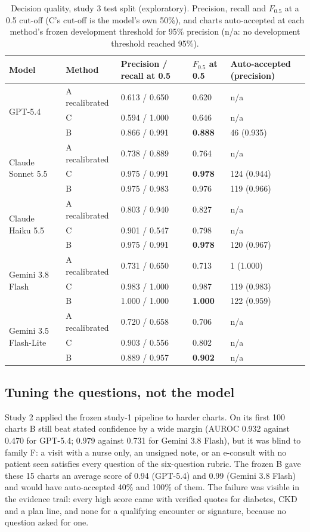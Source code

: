 \documentclass[10pt,letterpaper]{article}
\begin{document}
\begin{table}[!htbp]
\centering\small
\caption{Decision quality, study 3 test split (exploratory). Precision, recall and $F_{0.5}$ at a 0.5 cut-off (C's cut-off is the model's own 50\%), and charts auto-accepted at each method's frozen development threshold for 95\% precision (n/a: no development threshold reached 95\%).}\label{tab:decision}
\begin{tabular}{@{}lllll@{}}
\toprule
Model & Method & Precision / recall at 0.5 & $F_{0.5}$ at 0.5 & Auto-accepted (precision) \\
\midrule
\multirow{3}{*}{GPT-5.4} & A recalibrated & 0.613 / 0.650 & 0.620 & n/a \\
 & C & 0.594 / 1.000 & 0.646 & n/a \\
 & B & 0.866 / 0.991 & \textbf{0.888} & 46 (0.935) \\
\midrule
\multirow{3}{*}{Claude Sonnet 5.5} & A recalibrated & 0.738 / 0.889 & 0.764 & n/a \\
 & C & 0.975 / 0.991 & \textbf{0.978} & 124 (0.944) \\
 & B & 0.975 / 0.983 & 0.976 & 119 (0.966) \\
\midrule
\multirow{3}{*}{Claude Haiku 5.5} & A recalibrated & 0.803 / 0.940 & 0.827 & n/a \\
 & C & 0.901 / 0.547 & 0.798 & n/a \\
 & B & 0.975 / 0.991 & \textbf{0.978} & 120 (0.967) \\
\midrule
\multirow{3}{*}{Gemini 3.8 Flash} & A recalibrated & 0.731 / 0.650 & 0.713 & 1 (1.000) \\
 & C & 0.983 / 1.000 & 0.987 & 119 (0.983) \\
 & B & 1.000 / 1.000 & \textbf{1.000} & 122 (0.959) \\
\midrule
\multirow{3}{*}{Gemini 3.5 Flash-Lite} & A recalibrated & 0.720 / 0.658 & 0.706 & n/a \\
 & C & 0.903 / 0.556 & 0.802 & n/a \\
 & B & 0.889 / 0.957 & \textbf{0.902} & n/a \\
\bottomrule
\end{tabular}
\end{table}

\FloatBarrier
\subsection{Tuning the questions, not the model}\label{sec:results-tuning}

Study 2 applied the frozen study-1 pipeline to harder charts. On its first 100 charts B still beat stated confidence by a wide margin (AUROC 0.932 against 0.470 for GPT-5.4; 0.979 against 0.731 for Gemini 3.8 Flash), but it was blind to family F: a visit with a nurse only, an unsigned note, or an e-consult with no patient seen satisfies every question of the six-question rubric. The frozen B gave these 15 charts an average score of 0.94 (GPT-5.4) and 0.99 (Gemini 3.8 Flash) and would have auto-accepted 40\% and 100\% of them. The failure was visible in the evidence trail: every high score came with verified quotes for diabetes, CKD and a plan line, and none for a qualifying encounter or signature, because no question asked for one.
\end{document}
